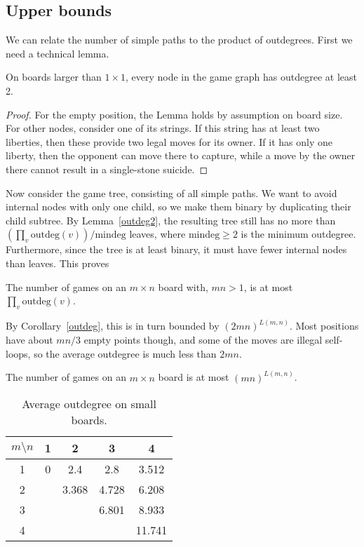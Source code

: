 \documentclass{article}
\begin{document}
\subsection{Upper bounds}
We can relate the number of simple paths to the product of outdegrees.
First we need a technical lemma.

\begin{lemma}
\label{outdeg2}
On boards larger than $1\times 1$, every node in the game graph has
outdegree at least 2.
\end{lemma}

\begin{proof}
For the empty position,
the Lemma holds by assumption on board size.
For other nodes, consider one of its strings. If this string
has at least two liberties, then these provide two legal moves for its owner.
If it has only one liberty, then the opponent can move there to capture, while
a move by the owner there cannot result in a single-stone suicide.
\end{proof}

Now consider the game tree, consisting of all simple paths. We want to
avoid internal nodes with only one child, so we make them binary
by duplicating their child subtree.
By Lemma~\ref{outdeg2}, the resulting tree still has no more than
$(\prod_v \mbox{outdeg}(v))/\mbox{mindeg}$ leaves,
where $\mbox{mindeg} \geq 2$ is the minimum outdegree.
Furthermore, since the tree is at least binary, it
must have fewer internal nodes than leaves. This proves

\begin{lemma}
The number of games on an $m \times n$ board with, $mn>1$, is at most
$\prod_v \mbox{outdeg}(v)$.
\end{lemma}

By Corollary~\ref{outdeg}, this is in turn bounded by $(2mn)^{L(m,n)}$.
Most positions have about $mn/3$ empty points though, and some of the moves
are illegal self-loops, so the average outdegree is much less than $2mn$.

\begin{theorem}
\label{games-upper-bound}
The number of games on an $m \times n$ board is at most $(mn)^{L(m,n)}$.
\end{theorem}

\begin{table}
\begin{center}
\begin{tabular}{|c||c|c|c|c|}
\hline
$m \setminus n$ & 1 & 2 & 3 & 4 \\ \hline
1     & 0 & 2.4   & 2.8   & 3.512 \\
2     &   & 3.368 & 4.728 & 6.208 \\
3     &   &       & 6.801 & 8.933 \\
4     &   &       &       & 11.741 \\
\hline
\end{tabular}
\end{center}
\caption{Average outdegree on small boards.}
\label{avgoutdeg}
\end{table}
\end{document}
